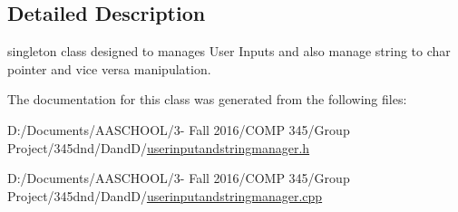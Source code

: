 \subsection{Detailed Description}
singleton class designed to manages User Inputs and also manage string to char pointer and vice versa manipulation. 

The documentation for this class was generated from the following files\+:\begin{DoxyCompactItemize}
\item 
D\+:/\+Documents/\+A\+A\+S\+C\+H\+O\+O\+L/3-\/ Fall 2016/\+C\+O\+M\+P 345/\+Group Project/345dnd/\+Dand\+D/\hyperlink{userinputandstringmanager_8h}{userinputandstringmanager.\+h}\item 
D\+:/\+Documents/\+A\+A\+S\+C\+H\+O\+O\+L/3-\/ Fall 2016/\+C\+O\+M\+P 345/\+Group Project/345dnd/\+Dand\+D/\hyperlink{userinputandstringmanager_8cpp}{userinputandstringmanager.\+cpp}\end{DoxyCompactItemize}
